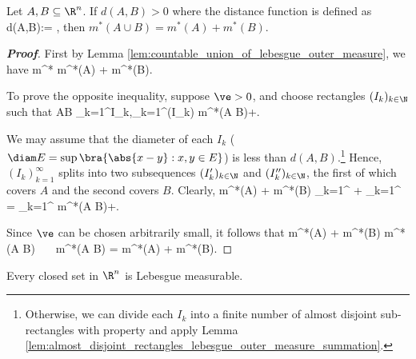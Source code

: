 \begin{lemma}\label{lem:distance_function_positive_implies_lebesgue_outer_measure_additivity}
Let $A,B\subseteq \R^n$. If $d(A,B)>0$ where the distance function is defined as
\be
d(A,B):= \inf{},
\ee
then $m^*(A\cup B) = m^*(A) + m^*(B)$.
\end{lemma}

\begin{proof}[\bf Proof]
First by Lemma \ref{lem:countable_union_of_lebesgue_outer_measure}, we have
\be
m^* \leq m^*(A) + m^*(B).
\ee

To prove the opposite inequality, suppose $\ve>0$, and choose rectangles $(I_k)_{k\in \N}$ such that
\be
A\cup B \subseteq \bigcup_{k=1}^\infty I_k,\qquad \sum_{k=1}^\infty \vol(I_k) \leq m^*(A \cup B)+\ve.
\ee

We may assume that the diameter of each $I_k$ ($\diam E = \sup\bra{\abs{x-y}:x,y\in E}$) is less than $d(A,B)$.\footnote{Otherwise, we can divide each $I_k$ into a finite number of almost disjoint sub-rectangles with property and apply Lemma \ref{lem:almost_disjoint_rectangles_lebesgue_outer_measure_summation}.} Hence, $(I_k)_{k=1}^\infty$ splits into two subsequences $(I_k')_{k\in \N}$ and $(I_k'')_{k\in \N}$, the first of which covers $A$ and the second covers $B$. Clearly,
\be
m^*(A) + m^*(B) \leq \sum_{k=1}^\infty \vol{} + \sum_{k=1}^\infty \vol{} = \sum_{k=1}^\infty \vol{} \leq m^*(A \cup B)+\ve.
\ee

Since $\ve$ can be chosen arbitrarily small, it follows that
\be
m^*(A) + m^*(B) \leq m^*(A \cup B) \ \ra\ \ m^*(A \cup B) = m^*(A) + m^*(B).
\ee
\end{proof}

\begin{theorem}\label{thm:closed_set_real_n_lebesgue_measurable}
Every closed set in $\R^n$ is Lebesgue measurable.
\end{theorem}

